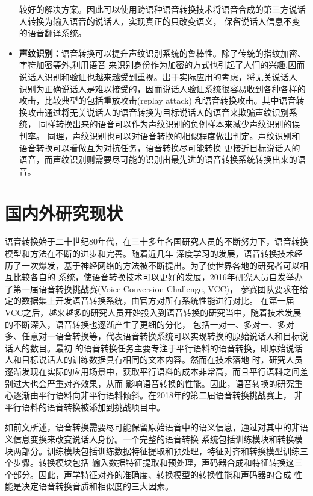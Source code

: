 \begin{itemize}
    较好的解决方案。因此可以使用跨语种语音转换技术将语音合成的第三方说话人转换为输入语音的说话人，实现真正的只改变语义，
    保留说话人信息不变的语音翻译系统\cite{desai2010spectral}。
    \item \textbf{声纹识别：}语音转换可以提升声纹识别系统的鲁棒性。除了传统的指纹加密、字符加密等外,利用语音
    来识别身份作为加密的方式也引起了人们的兴趣,因而说话人识别和验证也越来越受到重视。出于实际应用的考虑，将无关说话人
    识别为正确说话人是难以接受的，因而说话人验证系统很容易收到各种各样的攻击，比较典型的包括重放攻击(replay attack)
    和语音转换攻击。其中语音转换攻击通过将无关说话人的语音转换为目标说话人的语音来欺骗声纹识别系统，
    同样转换出来的语音可以作为声纹识别的负例样本来减少声纹识别的误判率\cite{kinnunen2012vulnerability}。
    同理，声纹识别也可以对语音转换的相似程度做出判定。声纹识别和语音转换可以看做互为对抗任务，语音转换尽可能转换
    更接近目标说话人的语音，而声纹识别则需要尽可能的识别出最先进的语音转换系统转换出来的语音。

\end{itemize}

\section{国内外研究现状}
语音转换始于二十世纪80年代，在三十多年各国研究人员的不断努力下，语音转换模型和方法在不断的进步和完善。随着近几年
深度学习的发展，语音转换技术经历了一次爆发，基于神经网络的方法被不断提出。为了使世界各地的研究者可以相互比较各自的
系统，使语音转换技术可以更好的发展，2016年研究人员自发举办了第一届语音转换挑战赛(Voice Conversion Challenge, VCC)，
参赛团队要求在给定的数据集上开发语音转换系统，由官方对所有系统性能进行对比\cite{toda2016voice,wester2016analysis}。
在第一届VCC之后，越来越多的研究人员开始投入到语音转换的研究当中，随着技术发展的不断深入，语音转换也逐渐产生了更细的分化，
包括一对一、多对一、多对多、任意对一语音转换等，代表语音转换系统可以实现转换的原始说话人和目标说话人的数目。最初
的语音转换任务主要专注于平行语料的语音转换，即原始说话人和目标说话人的训练数据具有相同的文本内容。然而在技术落地
时，研究人员逐渐发现在实际的应用场景中，获取平行语料的成本非常高，而且平行语料之间差别过大也会严重对齐效果，从而
影响语音转换的性能。因此，语音转换的研究重心逐渐由平行语料向非平行语料倾斜。在2018年的第二届语音转换挑战赛上，
非平行语料的语音转换被添加到挑战项目中\cite{lorenzo2018voice}。

如前文所述，语音转换需要尽可能保留原始语音中的语义信息，通过对其中的非语义信息变换来改变说话人身份。一个完整的语音转换
系统包括训练模块和转换模块两部分。训练模块包括训练数据特征提取和预处理，特征对齐和转换模型训练三个步骤。转换模块包括
输入数据特征提取和预处理，声码器合成和特征转换这三个部分。因此，声学特征对齐的准确度、转换模型的转换性能和声码器的合成
性能是决定语音转换音质和相似度的三大因素。

